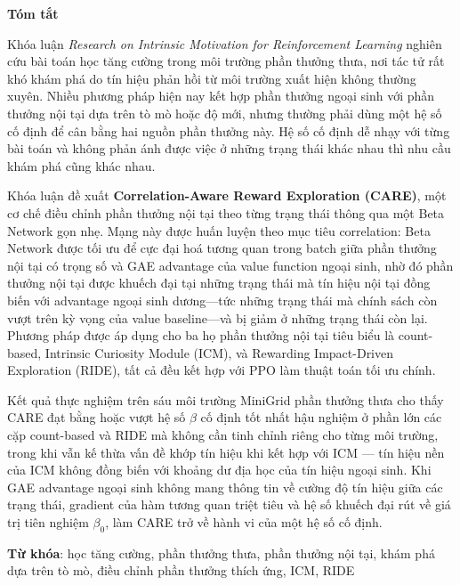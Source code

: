 {}
\begin{center}
\textbf{\large{Tóm tắt}}
\end{center}

\begin{small}

Khóa luận \textit{Research on Intrinsic Motivation for Reinforcement Learning} nghiên cứu bài toán học tăng cường trong môi trường phần thưởng thưa, nơi tác tử rất khó khám phá do tín hiệu phản hồi từ môi trường xuất hiện không thường xuyên. Nhiều phương pháp hiện nay kết hợp phần thưởng ngoại sinh với phần thưởng nội tại dựa trên tò mò hoặc độ mới, nhưng thường phải dùng một hệ số cố định để cân bằng hai nguồn phần thưởng này. Hệ số cố định dễ nhạy với từng bài toán và không phản ánh được việc ở những trạng thái khác nhau thì nhu cầu khám phá cũng khác nhau.

Khóa luận đề xuất \textbf{Correlation-Aware Reward Exploration (CARE)}, một cơ chế điều chỉnh phần thưởng nội tại theo từng trạng thái thông qua một Beta Network gọn nhẹ. Mạng này được huấn luyện theo mục tiêu correlation: Beta Network được tối ưu để cực đại hoá tương quan trong batch giữa phần thưởng nội tại có trọng số và GAE advantage của value function ngoại sinh, nhờ đó phần thưởng nội tại được khuếch đại tại những trạng thái mà tín hiệu nội tại đồng biến với advantage ngoại sinh dương---tức những trạng thái mà chính sách còn vượt trên kỳ vọng của value baseline---và bị giảm ở những trạng thái còn lại. Phương pháp được áp dụng cho ba họ phần thưởng nội tại tiêu biểu là count-based, Intrinsic Curiosity Module (ICM), và Rewarding Impact-Driven Exploration (RIDE), tất cả đều kết hợp với PPO làm thuật toán tối ưu chính.

Kết quả thực nghiệm trên sáu môi trường MiniGrid phần thưởng thưa cho thấy CARE đạt bằng hoặc vượt hệ số $\beta$ cố định tốt nhất hậu nghiệm ở phần lớn các cặp count-based và RIDE mà không cần tinh chỉnh riêng cho từng môi trường, trong khi vẫn kế thừa vấn đề khớp tín hiệu khi kết hợp với ICM --- tín hiệu nền của ICM không đồng biến với khoảng dư địa học của tín hiệu ngoại sinh. Khi GAE advantage ngoại sinh không mang thông tin về cường độ tín hiệu giữa các trạng thái, gradient của hàm tương quan triệt tiêu và hệ số khuếch đại rút về giá trị tiên nghiệm $\beta_0$, làm CARE trở về hành vi của một hệ số cố định.

\vspace*{1cm}
\textbf{Từ khóa}: học tăng cường, phần thưởng thưa, phần thưởng nội tại, khám phá dựa trên tò mò, điều chỉnh phần thưởng thích ứng, ICM, RIDE

\end{small}
